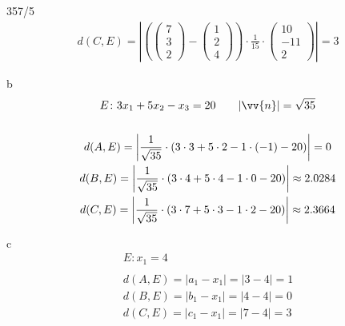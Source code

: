 \begin{exercise}{357/5}
\begin{gather*}
    d(C, E) = \left|\left(\begin{pmatrix}7 \\ 3 \\ 2\end{pmatrix} - \begin{pmatrix}1 \\ 2 \\ 4\end{pmatrix}\right) \cdot \frac{1}{15} \cdot \begin{pmatrix}10 \\ -11 \\ 2\end{pmatrix}\right| = 3
  \end{gather*}
  \item [b]
  \begin{gather*}
    E \colon 3x_1 + 5x_2 - x_3 = 20 \qquad |\vv{n}| = \sqrt{35} \\\\
    d(A, E) = \left|\frac{1}{\sqrt{35}} \cdot (3 \cdot 3 + 5 \cdot 2 - 1 \cdot (-1) - 20)\right| = 0 \\
    d(B, E) = \left|\frac{1}{\sqrt{35}} \cdot (3 \cdot 4 + 5 \cdot 4 - 1 \cdot 0 - 20)\right| \approx 2.0284 \\
    d(C, E) = \left|\frac{1}{\sqrt{35}} \cdot (3 \cdot 7 + 5 \cdot 3 - 1 \cdot 2 - 20)\right| \approx 2.3664
  \end{gather*}
  \item [c]
  \begin{gather*}
    E \colon x_1 = 4 \\\\
    d(A, E) = |a_1 - x_1| = |3 - 4| = 1 \\
    d(B, E) = |b_1 - x_1| = |4 - 4| = 0 \\
    d(C, E) = |c_1 - x_1| = |7 - 4| = 3
  \end{gather*}
\end{exercise}
